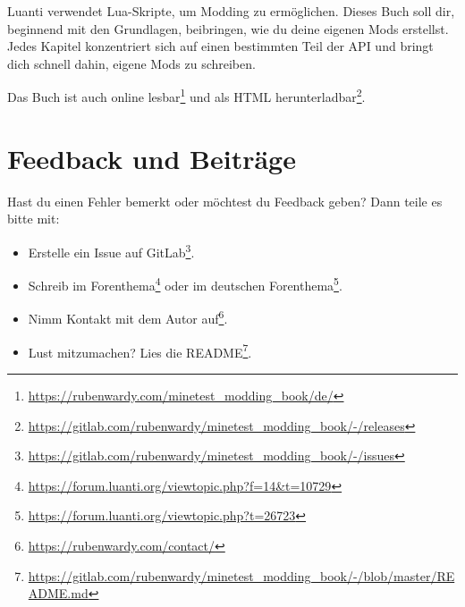 \label{ch:index}

Luanti verwendet Lua-Skripte, um Modding zu ermöglichen. Dieses Buch
soll dir, beginnend mit den Grundlagen, beibringen, wie du deine eigenen
Mods erstellst. Jedes Kapitel konzentriert sich auf einen bestimmten
Teil der API und bringt dich schnell dahin, eigene Mods zu schreiben.

Das Buch ist auch online lesbar\footnote{\url{https://rubenwardy.com/minetest_modding_book/de/}}
und als HTML herunterladbar\footnote{\url{https://gitlab.com/rubenwardy/minetest_modding_book/-/releases}}.

\section*{Feedback und Beiträge}\label{feedback-und-beitruxe4ge}

Hast du einen Fehler bemerkt oder möchtest du Feedback geben? Dann teile
es bitte mit:

\begin{itemize}
\tightlist
\item
  Erstelle ein Issue auf GitLab\footnote{\url{https://gitlab.com/rubenwardy/minetest_modding_book/-/issues}}.
\item
  Schreib im Forenthema\footnote{\url{https://forum.luanti.org/viewtopic.php?f=14&t=10729}}
  oder im deutschen Forenthema\footnote{\url{https://forum.luanti.org/viewtopic.php?t=26723}}.
\item
  Nimm Kontakt mit dem Autor auf\footnote{\url{https://rubenwardy.com/contact/}}.
\item
  Lust mitzumachen? Lies die README\footnote{\url{https://gitlab.com/rubenwardy/minetest_modding_book/-/blob/master/README.md}}.
\end{itemize}
